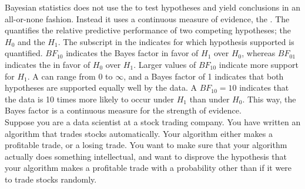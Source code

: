 \setcounter{section}{8}
\setcounter{subsection}{4}
\setcounter{question}{0}



Bayesian statistics does not use the  to test hypotheses and yield conclusions in an all-or-none fashion. Instead it uses a continuous measure of evidence, the . The  quantifies the relative predictive performance of two competing hypotheses; the  $H_0$ and the  $H_1$. The subscript in the  indicates for which hypothesis supported is quantified. $BF_{10}$ indicates the Bayes factor in favor of $H_1$ over $H_0$, whereas $BF_{01}$ indicates the  in favor of $H_0$ over $H_1$. Larger values of $BF_{10}$ indicate more support for $H_1$. A  can range from 0 to $\infty$, and a Bayes factor of 1 indicates that both hypotheses are supported equally well by the data. A $BF_{10} = 10$ indicates that the data is 10 times more likely to occur under $H_1$ than under $H_0$. This way, the Bayes factor is a continuous measure for the strength of evidence. \\

Suppose you are a data scientist at a stock trading company. You have written an algorithm that trades stocks automatically. Your algorithm either makes a profitable trade, or a losing trade. You want to make sure that your algorithm actually does something intellectual, and want to disprove the hypothesis that your algorithm makes a profitable trade with a probability other than if it were to trade stocks randomly. \\


\hypothesesbox



